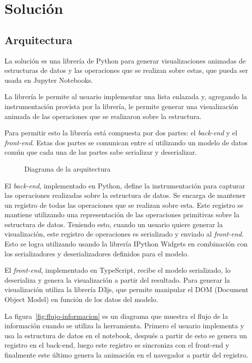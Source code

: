 \chapter{Solución}

\section{Arquitectura}

La solución es una librería de Python para generar visualizaciones animadas de estructuras de datos y las operaciones que se realizan sobre estas, que pueda ser usada en Jupyter Notebooks.

La librería le permite al usuario implementar una lista enlazada y, agregando la instrumentación provista por la librería, le permite generar una visualización animada de las operaciones que se realizaron sobre la estructura.

Para permitir esto la librería está compuesta por dos partes: el \textit{back-end} y el \textit{front-end}. Estas dos partes se comunican entre sí utilizando un modelo de datos común que cada una de las partes sabe serializar y deserializar.

\begin{figure}[htb]
    \centering
    
    \caption{Diagrama de la arquitectura}
    \label{fig:diagrama-arq}
\end{figure}

El \textit{back-end}, implementado en Python, define la instrumentación para capturar las operaciones realizadas sobre la estructura de datos. Se encarga de mantener un registro de todas las operaciones que se realizan sobre esta. Este registro se mantiene utilizando una representación de las operaciones primitivas sobre la estructura de datos. Teniendo esto, cuando un usuario quiere generar la visualización, este registro de operaciones es serializado y enviado al \textit{front-end}. Esto se logra utilizando usando la librería IPython Widgets en combinación con los serializadores y deserializadores definidos para el modelo.

El \textit{front-end}, implementado en TypeScript, recibe el modelo serializado, lo deserializa y genera la visualización a partir del resultado. Para generar la visualización utiliza la librería D3js, que permite manipular el DOM (Document Object Model) en función de los datos del modelo.

La figura~\ref{fig:flujo-informacion} es un diagrama que muestra el flujo de la información cuando se utiliza la herramienta. Primero el usuario implementa y usa la estructura de datos en el notebook, después a partir de esto se genera un registro en el back-end, luego este registro se sincroniza con el front-end y finalmente este último genera la animación en el navegador a partir del registro.

